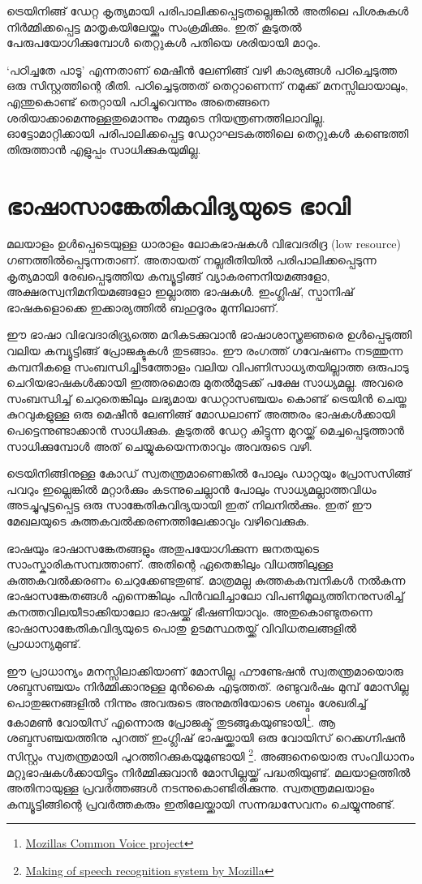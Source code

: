 \documentclass[12pt,twoside,a4paper]{article}
\begin{document}
ട്രെയിനിങ്ങ് ഡേറ്റ കൃത്യമായി പരിപാലിക്കപ്പെട്ടതല്ലെങ്കിൽ അതിലെ പിശകുകൾ നിർമ്മിക്കപ്പെട്ട മാതൃകയിലേയ്ക്കും സംക്രമിക്കും. ഇത് കൂടുതൽ പേരുപയോഗിക്കുമ്പോൾ തെറ്റുകൾ പതിയെ ശരിയായി മാറും.

`പഠിച്ചതേ പാടൂ' എന്നതാണ് മെഷീൻ ലേണിങ്ങ് വഴി കാര്യങ്ങൾ പഠിച്ചെടുത്ത ഒരു സിസ്റ്റത്തിന്റെ രീതി. പഠിച്ചെടുത്തത് തെറ്റാണെന്ന് നമുക്ക് മനസ്സിലായാലും, എന്തുകൊണ്ട് തെറ്റായി പഠിച്ചുവെന്നും അതെങ്ങനെ ശരിയാക്കാമെന്നുള്ളതുമൊന്നും നമ്മുടെ നിയന്ത്രണത്തിലാവില്ല.  ഓട്ടോമാറ്റിക്കായി പരിപാലിക്കപ്പെട്ട ഡേറ്റാഘടകത്തിലെ തെറ്റുകൾ  കണ്ടെത്തി തിരുത്താൻ എളുപ്പം സാധിക്കുകയുമില്ല.

\section{ഭാഷാസാങ്കേതികവിദ്യയുടെ ഭാവി}

മലയാളം ഉൾപ്പെടെയുള്ള ധാരാളം ലോകഭാഷകൾ വിഭവദരിദ്ര (low resource) ഗണത്തിൽപ്പെടുന്നതാണ്. അതായത് നല്ലരീതിയിൽ പരിപാലിക്കപ്പെടുന്ന കൃത്യമായി രേഖപ്പെടുത്തിയ കമ്പ്യൂട്ടിങ്ങ് വ്യാകരണനിയമങ്ങളോ, അക്ഷരസ്വനിമനിയമങ്ങളോ ഇല്ലാത്ത ഭാഷകൾ. ഇംഗ്ലിഷ്, സ്പാനിഷ് ഭാഷകളൊക്കെ ഇക്കാര്യത്തിൽ ബഹുദൂരം മുന്നിലാണ്.

ഈ ഭാഷാ വിഭവദാരിദ്ര്യത്തെ മറികടക്കുവാൻ ഭാഷാശാസ്ത്രജ്ഞരെ ഉൾപ്പെടുത്തി വലിയ കമ്പ്യൂട്ടിങ്ങ് പ്രോജക്ടുകൾ തുടങ്ങാം. ഈ രംഗത്ത് ഗവേഷണം നടത്തുന്ന കമ്പനികളെ സംബന്ധിച്ചിടത്തോളം വലിയ വിപണിസാധ്യതയില്ലാത്ത ഒരുപാടു ചെറിയഭാഷകൾക്കായി ഇത്തരമൊരു മുതൽമുടക്ക്  പക്ഷേ സാധ്യമല്ല. അവരെ സംബന്ധിച്ച് ചെറുതെങ്കിലും ലഭ്യമായ ഡേറ്റാസഞ്ചയം കൊണ്ട് ട്രെയിൻ ചെയ്ത കുറവുകളുള്ള ഒരു മെഷീൻ ലേണിങ്ങ്  മോഡലാണ് അത്തരം ഭാഷകൾക്കായി പെട്ടെന്നുണ്ടാക്കാൻ സാധിക്കുക. കൂടുതൽ ഡേറ്റ കിട്ടുന്ന മുറയ്ക്ക് മെച്ചപ്പെടുത്താൻ സാധിക്കുമ്പോൾ അത് ചെയ്യുകയെന്നതാവും അവരുടെ വഴി.

ട്രെയിനിങ്ങിനുള്ള കോഡ് സ്വതന്ത്രമാണെങ്കിൽ പോലും ഡാറ്റയും പ്രോസസിങ്ങ് പവറും ഇല്ലെങ്കിൽ മറ്റാർക്കും കടന്നുചെല്ലാൻ പോലും  സാധ്യമല്ലാത്തവിധം അടച്ചുപൂട്ടപ്പെട്ട ഒരു സാങ്കേതികവിദ്യയായി ഇത് നിലനിൽക്കും. ഇത് ഈ മേഖലയുടെ കുത്തകവൽക്കരണത്തിലേക്കാവും വഴിവെക്കുക.

ഭാഷയും ഭാഷാസങ്കേതങ്ങളും അതുപയോഗിക്കുന്ന ജനതയുടെ സാംസ്കാരികസമ്പത്താണ്. അതിന്റെ ഏതെങ്കിലും വിധത്തിലുള്ള കുത്തകവൽക്കരണം ചെറുക്കേണ്ടതുണ്ട്. മാത്രമല്ല കുത്തകകമ്പനികൾ നൽകുന്ന ഭാഷാസങ്കേതങ്ങൾ എന്നെങ്കിലും പിൻവലിച്ചാലോ വിപണിമൂല്യത്തിനനുസരിച്ച്  കനത്തവിലയീടാക്കിയാലോ ഭാഷയ്ക്ക് ഭീഷണിയാവും. അതുകൊണ്ടുതന്നെ ഭാഷാസാങ്കേതികവിദ്യയുടെ പൊതു ഉടമസ്ഥതയ്ക്ക് വിവിധതലങ്ങളിൽ പ്രാധാന്യമുണ്ട്.

ഈ പ്രാധാന്യം മനസ്സിലാക്കിയാണ് മോസില്ല ഫൗണ്ടേഷൻ സ്വതന്ത്രമായൊരു ശബ്ദസഞ്ചയം നിർമ്മിക്കാനുള്ള മുൻകൈ എടുത്തത്. രണ്ടുവർഷം മുമ്പ് മോസില്ല പൊതുജനങ്ങളിൽ നിന്നും അവരുടെ അനുമതിയോടെ ശബ്ദം ശേഖരിച്ച് കോമൺ വോയിസ് എന്നൊരു പ്രോജക്ട് തുടങ്ങുകയുണ്ടായി\footnote{\href{https://blog.mozilla.org/blog/2017/11/29/announcing-the-initial-release-of-mozillas-open-source-speech-recognition-model-and-voice-dataset/}{Mozillas Common Voice project}}. ആ ശബ്ദസഞ്ചയത്തിനു പുറത്ത് ഇംഗ്ലിഷ് ഭാഷയ്ക്കായി ഒരു വോയിസ് റെക്കഗ്നിഷൻ സിസ്റ്റം സ്വതന്ത്രമായി പുറത്തിറക്കുകയുമുണ്ടായി \footnote{\href{https://hacks.mozilla.org/2017/11/a-journey-to-10-word-error-rate/}{Making of speech recognition system by Mozilla}}. അങ്ങനെയൊരു സംവിധാനം മറ്റുഭാഷകൾക്കായിട്ടും നിർമ്മിക്കുവാൻ മോസില്ലയ്ക്ക് പദ്ധതിയുണ്ട്. മലയാളത്തിൽ അതിനായുള്ള പ്രവർത്തങ്ങൾ നടന്നുകൊണ്ടിരിക്കുന്നു. സ്വതന്ത്രമലയാളം കമ്പ്യൂട്ടിങ്ങിന്റെ പ്രവർത്തകരും ഇതിലേയ്ക്കായി സന്നദ്ധസേവനം ചെയ്യുന്നുണ്ട്.
\end{document}
